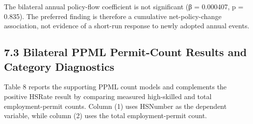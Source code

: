 \documentclass[11pt,a4paper]{article}
\begin{document}
The bilateral annual policy-flow coefficient is not significant (β =
0.000407, p = 0.835). The preferred finding is therefore a cumulative
net-policy-change association, not evidence of a short-run response to
newly adopted annual events.

\subsection{7.3 Bilateral PPML Permit-Count Results and Category Diagnostics}\label{bilateral-ppml-results}

Table 8 reports the supporting PPML count models and complements the
positive HSRate result by comparing measured high-skilled and total
employment-permit counts. Column (1) uses HSNumber as the dependent
variable, while column (2) uses the total employment-permit count.
\end{document}
